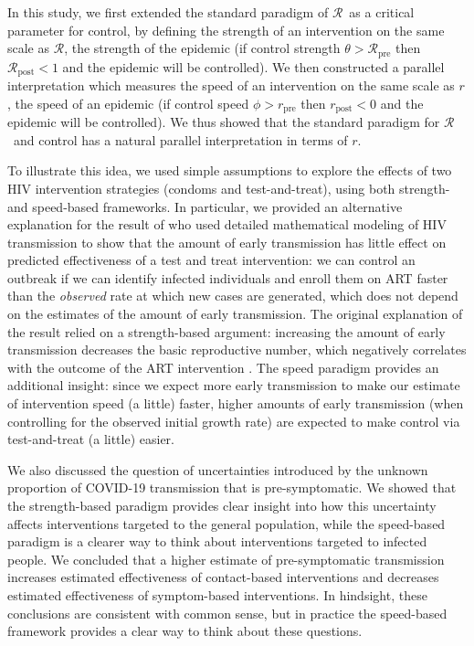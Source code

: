 \documentclass[12pt]{article}
\newcommand{\RR}{\ensuremath{{\mathcal R}}}
\newcommand{\Rx}[1]{\ensuremath{\RR_{\mathrm{#1}}}}
\newcommand{\Rpre}{\Rx{pre}}
\newcommand{\Rpost}{\Rx{post}}
\newcommand{\rr}{\ensuremath{{r}}}
\newcommand{\rx}[1]{\ensuremath{\rr_{\mathrm{#1}}}}
\newcommand{\rpre}{\rx{pre}}
\newcommand{\rpost}{\rx{post}}
\begin{document}
In this study, we first extended the standard paradigm of \RR\ as a critical parameter for control, by defining the strength of an intervention on the same scale as \RR, the strength of the epidemic (if control strength $\theta > \Rpre$ then $\Rpost<1$ and the epidemic will be controlled). 
We then constructed a parallel interpretation which measures the speed of an intervention on the same scale as $r$, the speed of an epidemic  (if control speed $\phi > \rpre$ then $\rpost<0$ and the epidemic will be controlled).
We thus showed that the standard paradigm for \RR\ and control has a natural parallel interpretation in terms of $r$.

To illustrate this idea, we used simple assumptions to explore the effects of two HIV intervention strategies (condoms and test-and-treat), using both strength- and speed-based frameworks.
In particular, we provided an alternative explanation for the result of \cite{eaton2014proportion} who used detailed mathematical modeling of HIV transmission to show that the amount of early transmission has little effect on predicted effectiveness of a test and treat intervention:
we can control an outbreak if we can identify infected individuals and enroll them on ART faster than the \emph{observed} rate at which new cases are generated, which does not depend on the estimates of the amount of early transmission.
The original explanation of the result relied on a strength-based argument: increasing the amount of early transmission decreases the basic reproductive number, which negatively correlates with the outcome of the ART intervention \citep{eaton2014proportion}.
The speed paradigm provides an additional insight: since we expect more early transmission to make our estimate of intervention speed (a little) faster, higher amounts of early transmission (when controlling for the observed initial growth rate) are expected to make control via test-and-treat (a little) easier.

We also discussed the question of uncertainties introduced by the unknown proportion of COVID-19 transmission that is pre-symptomatic. We showed that the strength-based paradigm provides clear insight into how this uncertainty affects interventions targeted to the general population, while the speed-based paradigm is a clearer way to think about interventions targeted to infected people. We concluded that a higher estimate of pre-symptomatic transmission increases estimated effectiveness of contact-based interventions and decreases estimated effectiveness of symptom-based interventions. In hindsight, these conclusions are consistent with common sense, but in practice the speed-based framework provides a clear way to think about these questions.
\end{document}
